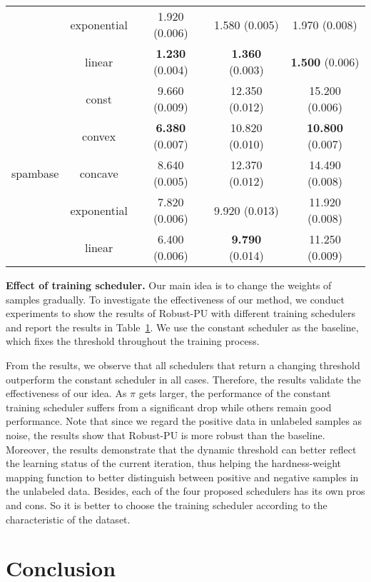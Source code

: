 \documentclass[sigconf]{acmart}
\newcommand{\ourmethod}{Robust-PU\xspace}
\begin{document}
\begin{table}[htbp]
{\begin{tabular}{ccccc}
        & exponential & 1.920 (0.006) & 1.580 (0.005) & 1.970 (0.008) \\
        & linear & \textbf{1.230} (0.004) & \textbf{1.360} (0.003) & \textbf{1.500} (0.006)\\
        \hline
        \multirow{5}{*}{spambase} & const & 9.660 (0.009) & 12.350 (0.012) & 15.200 (0.006)\\
        \cline{2-5}
        & convex & \textbf{6.380} (0.007) & 10.820 (0.010) & \textbf{10.800} (0.007) \\
        & concave & 8.640 (0.005) & 12.370 (0.012) & 14.490 (0.008) \\
        & exponential & 7.820 (0.006) & 9.920 (0.013) & 11.920 (0.008) \\
        & linear & 6.400 (0.006) & \textbf{9.790} (0.014) & 11.250 (0.009)\\
        \bottomrule
    \end{tabular}
    }
    \label{tab:abl_ts}
\end{table}

\textbf{Effect of training scheduler.}
Our main idea is to change the weights of samples gradually. To investigate the effectiveness of our method, we conduct experiments to show the results of \ourmethod with different training schedulers and report the results in Table~\ref{tab:abl_ts}. We use the constant scheduler as the baseline, which fixes the threshold throughout the training process.

From the results, we observe that all schedulers that return a changing threshold outperform the constant scheduler in all cases. Therefore, the results validate the effectiveness of our idea. As $\pi$ gets larger, the performance of the constant training scheduler suffers from a significant drop while others remain good performance. Note that since we regard the positive data in unlabeled samples as noise, the results show that \ourmethod is more robust than the baseline. Moreover, the results demonstrate that the dynamic threshold can better reflect the learning status of the current iteration, thus helping the hardness-weight mapping function to better distinguish between positive and negative samples in the unlabeled data. Besides, each of the four proposed schedulers has its own pros and cons. So it is better to choose the training scheduler according to the characteristic of the dataset.


\section{Conclusion}
\end{document}
